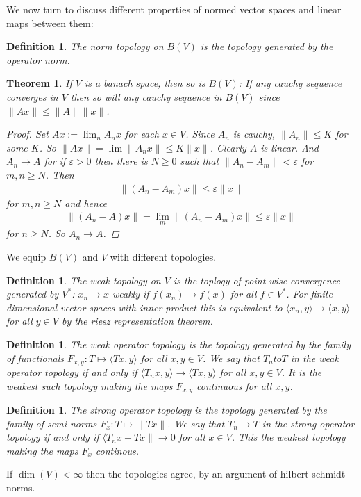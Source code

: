 \documentclass[10pt,twoside,openany,final]{memoir}
\theoremstyle{break}
\newtheorem{theorem}[section]{Theorem}
\newtheorem{definition}[section]{Definition}
\theoremstyle{Break}
\newcommand{\lv}{\lVert}
\newcommand{\rv}{\rVert}
\begin{document}
We now turn to discuss different properties of normed vector spaces and linear maps between them:
\begin{definition}
	The norm topology on $B(V)$ is the topology generated by the operator norm.
\end{definition}

\begin{theorem}
	If $V$ is a banach space, then so is $B(V)$: If any cauchy sequence converges in $V$ then so will any cauchy sequence in $B(V)$ since $\lv Ax \rv \leq \lv A \rv \lv x \rv$.
	\begin{proof}
		Set $Ax:=\lim_{n} A_n x$ for each $x \in V$. Since $A_n$ is cauchy, $\lv A_n \rv \leq K$ for some $K$. So $\lv Ax \rv = \lim \lv A_n x \rv \leq K\lv x \rv$. Clearly $A$ is linear. And $A_n \to A$ for if $\varepsilon > 0 $ then there is $N \geq 0$ such that $\lv A_n -A_m\rv < \varepsilon$ for $m,n \geq N$. Then 
		\begin{align*}
			\lv (A_n-A_m)x\rv \leq \varepsilon\lv x \rv
		\end{align*}
		for $m,n \geq N$ and hence
		\begin{align*}
			\lv (A_n-A)x \rv = \lim_{m} \lv (A_n-A_m)x\rv \leq \varepsilon\lv x \rv
		\end{align*}
		for $n \geq N$. So $A_n \to A$.
	\end{proof}
\end{theorem}
We equip $B(V)$ and $V$ with different topologies.
\begin{definition}
	The weak topology on $V$ is the toplogy of point-wise convergence generated by $V^*$: $x_n \to x$ weakly if $f(x_n) \to f(x)$ for all $f \in V^*$. For finite dimensional vector spaces with inner product this is equivalent to $\langle x_n,y \rangle \to \langle x,y \rangle$ for all $y \in V$ by the riesz representation theorem.
\end{definition}
\begin{definition}
	The weak operator topology is the topology generated by the family of functionals $F_{x,y}: T \mapsto \langle Tx,y\rangle$ for all $x,y \in V$. We say that $T_n to T$ in the weak operator topology if and only if $\langle T_n x,y \rangle \to \langle Tx,y \rangle$ for all $x,y \in V$. It is the weakest such topology making the maps $F_{x,y}$ continuous for all $x,y$.
\end{definition}
\begin{definition}
	The strong operator topology is the topology generated by the family of semi-norms $F_x : T \mapsto \lv Tx \rv$. We say that $T_n \to T$ in the strong operator topology if and only if $\langle T_n x - Tx \rv \to 0$ for all $x \in V$. This the weakest topology making the maps $F_x$ continous.
\end{definition}

If $\dim(V)< \infty$ then the topologies agree, by an argument of hilbert-schmidt norms.
\end{document}
